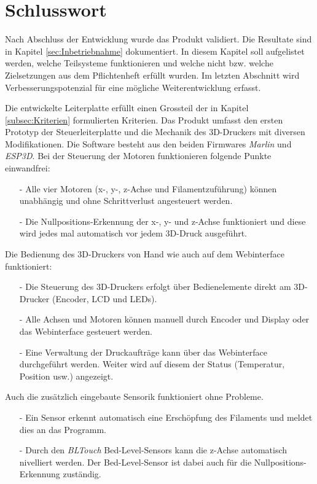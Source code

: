 \clearpage
\section{Schlusswort}\label{sec:Schlusswort}
Nach Abschluss der Entwicklung wurde das Produkt validiert. Die Resultate sind in Kapitel \ref{sec:Inbetriebnahme} dokumentiert.  In diesem Kapitel soll aufgelistet werden, welche Teilsysteme funktionieren und welche nicht bzw. welche Zielsetzungen aus dem Pflichtenheft erfüllt wurden. Im letzten Abschnitt wird Verbesserungspotenzial für eine mögliche Weiterentwicklung erfasst.

Die entwickelte Leiterplatte erfüllt einen Grossteil der in Kapitel \ref{subsec:Kriterien} formulierten Kriterien. Das Produkt umfasst den ersten Prototyp der Steuerleiterplatte und die Mechanik des 3D-Druckers mit diversen Modifikationen. Die Software   besteht aus den beiden Firmwares \textit{Marlin} und \textit{ESP3D}. Bei der Steuerung der Motoren funktionieren folgende Punkte einwandfrei:

\begin{itemize}
	\item[-] Alle vier Motoren (x-, y-, z-Achse und Filamentzuführung) können unabhängig und ohne Schrittverlust angesteuert werden. 
	\item[-] Die Nullpositions-Erkennung der x-, y- und z-Achse funktioniert und diese wird jedes mal automatisch vor jedem 3D-Druck ausgeführt.
\end{itemize}

Die Bedienung des 3D-Druckers von Hand wie auch auf dem Webinterface funktioniert:
\begin{itemize}
	\item[-] Die Steuerung des 3D-Druckers erfolgt über Bedienelemente direkt am 3D-Drucker (Encoder, LCD und LEDs).
	\item[-] Alle Achsen und Motoren können manuell durch Encoder und Display oder das Webinterface gesteuert werden.
	\item[-] Eine Verwaltung der Druckaufträge kann über das Webinterface durchgeführt werden. Weiter wird auf diesem der Status (Temperatur, Position usw.) angezeigt.
\end{itemize}

Auch die zusätzlich eingebaute Sensorik funktioniert ohne Probleme.

\begin{itemize}
\item[-] Ein Sensor erkennt automatisch eine Erschöpfung des Filaments und meldet dies an das Programm.
\item[-] Durch den \textit{BLTouch} Bed-Level-Sensors kann die z-Achse automatisch nivelliert werden. Der Bed-Level-Sensor ist dabei auch für die Nullpositions-Erkennung zuständig.
\end{itemize}

